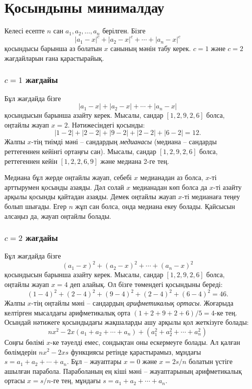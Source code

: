 \section{Қосындыны минималдау}

Келесі есепте $n$ сан
$a_1,a_2,\ldots,a_n$ берілген. 
Бізге \[|a_1-x|^c+|a_2-x|^c+\cdots+|a_n-x|^c\]
қосындысы барынша аз болатын $x$ санының
мәнін табу керек.
$c=1$ және $c=2$ жағдайларын ғана қарастырайық.

\subsubsection{$c=1$ жағдайы}

Бұл жағдайда бізге 
\[|a_1-x|+|a_2-x|+\cdots+|a_n-x|\] қосындысын
барынша азайту керек.
Мысалы, сандар $[1,2,9,2,6]$ болса,
оңтайлы жауап $x=2$.
Нәтижесіндегі қосынды:
\[
|1-2|+|2-2|+|9-2|+|2-2|+|6-2|=12.
\]
Жалпы $x$-тің тиімді мәні -- сандардың 
\textit{медианасы} (медиана --
сандарды реттегеннен кейінгі ортаңғы сан).
Мысалы, сандар $[1,2,9,2,6]$ болса,
реттегеннен кейін $[1,2,2,6,9]$ және
медиана 2-ге тең.

Медиана бұл жерде оңтайлы жауап, 
себебі $x$ медианадан аз болса,
$x$-ті арттырумен қосынды азаяды.
Дәл солай $x$ медианадан көп болса да
$x$-ті азайту арқылы қосынды қайтадан азаяды.
Демек оңтайлы жауап $x$-ті медианаға теңеу болып шығады.
Егер $n$ жұп сан болса, онда медиана екеу болады.
Қайсысын алсаңыз да, жауап оңтайлы болады. 

\subsubsection{$c=2$ жағдайы}

Бұл жағдайда бізге \[(a_1-x)^2+(a_2-x)^2+\cdots+(a_n-x)^2\]
қосындысын барынша азайту керек. Мысалы, 
сандар $[1,2,9,2,6]$ болса, оңтайлы жауап
$x=4$ деп алайық. Ол бізге төмендегі қосындыны береді:
\[
(1-4)^2+(2-4)^2+(9-4)^2+(2-4)^2+(6-4)^2=46.
\]
Жалпы $x$-тің оңтайлы мәні -- сандардың
\emph{арифметикалық ортасы}.
Жоғарыда келтірген мысалдағы арифметикалық орта
$(1+2+9+2+6)/5=4$-ке тең.
Осындай нәтижеге қосындыдағы жақшаларды
ашу арқылы қол жеткізуге болады:
\[
nx^2 - 2x(a_1+a_2+\cdots+a_n) + (a_1^2+a_2^2+\cdots+a_n^2)
\]
Соңғы бөлімі $x$-ке тәуелді емес, сондықтан
оны ескермеуге болады.
Ал қалған бөлімдерін $nx^2-2xs$ функциясы ретінде қарастырамыз,
мұндағы $s=a_1+a_2+\cdots+a_n$.
Бұл -- жауаптары $x=0$ және $x=2s/n$ болатын
үстіге ашылған парабола. Параболаның ең кіші мәні --
жауаптарының арифметикалық ортасы $x=s/n$-ге тең,
мұндағы $s=a_1+a_2+\cdots+a_n$.

